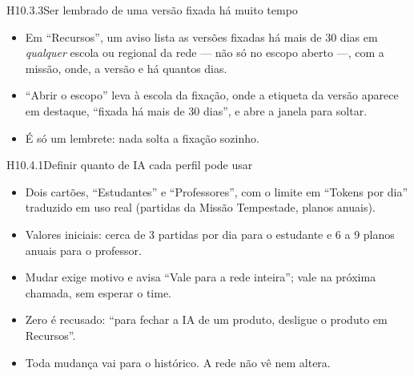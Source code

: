 \begin{historia}{H10.3.3}{Ser lembrado de uma versão fixada há muito tempo}{\pronto}
\aceite
\begin{itemize}
  \item Em \enquote{Recursos}, um aviso lista as versões fixadas há mais de 30
    dias em \emph{qualquer} escola ou regional da rede --- não só no escopo
    aberto ---, com a missão, onde, a versão e há quantos dias.
  \item \enquote{Abrir o escopo} leva à escola da fixação, onde a etiqueta da
    versão aparece em destaque, \enquote{fixada há mais de 30 dias}, e abre a
    janela para soltar.
  \item É só um lembrete: nada solta a fixação sozinho.
\end{itemize}
\end{historia}


\begin{historia}{H10.4.1}{Definir quanto de IA cada perfil pode usar}{\pronto}
\aceite
\begin{itemize}
  \item Dois cartões, \enquote{Estudantes} e \enquote{Professores}, com o
    limite em \enquote{Tokens por dia} traduzido em uso real (partidas da
    Missão Tempestade, planos anuais).
  \item Valores iniciais: cerca de 3 partidas por dia para o estudante e 6 a 9
    planos anuais para o professor.
  \item Mudar exige motivo e avisa \enquote{Vale para a rede inteira}; vale na
    próxima chamada, sem esperar o time.
  \item Zero é recusado: \enquote{para fechar a IA de um produto, desligue o
    produto em Recursos}.
  \item Toda mudança vai para o histórico. A rede não vê nem altera.
\end{itemize}
\end{historia}

